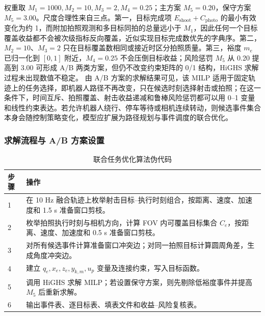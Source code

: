 \documentclass{cumcmthesis}
\begin{document}
权重取 $M_1=1000,M_2=10,M_3=2,M_4=0.25$；主方案 $M_5=0.20$，保守方案 $M_5=3.00$。尺度合理性来自三点。第一，目标完成项 $E_{\mathrm{shoot}}+C_{\mathrm{photo}}$ 的最小有效变化为约 1，而附加拍照观测和多目标同拍的总量远小于 $M_1$，因此任何一个目标覆盖收益都不会被次级指标反向覆盖，近似实现目标完成数优先的字典序。第二，$M_2=10$、$M_3=2$ 只在目标覆盖数相同或接近时区分拍照质量。第三，裕度 $m_e$ 已归一化到 $[0,1]$ 附近，$M_4=0.25$ 不会压倒目标收益；风险惩罚 $M_5$ 从 0.20 提高到 3.00 可形成 A/B 两类方案，但仍不改变约束矩阵的 0/1 结构，HiGHS 求解过程未出现数值不稳定。
由 A/B 方案的求解结果可见，该 MILP 适用于固定轨迹上的任务选择，即机器人路径不再改变，只在候选时刻选择射击或拍照；在这一条件下，时间互斥、拍照覆盖、射击收益递减和鲁棒风险惩罚都可以用 0--1 变量和线性约束表达。若允许机器人绕行、停车等待或相机连续转动，则候选事件集合本身会随控制策略变化，模型应扩展为路径规划与事件调度的联合优化。

\subsubsection{求解流程与 A/B 方案设置}
\begin{table}[H]
  \centering
  \caption{联合任务优化算法伪代码}
  \label{tab:algorithm}
  \small
  \begin{tabular}{p{}p{}}
    \toprule
    步骤 & 操作\\
    \midrule
    1 & 在 10 Hz 融合轨迹上枚举射击目标--执行时刻组合，按距离、速度、加速度和 1.5 s 准备窗口剪枝。\\
    2 & 枚举拍照执行时刻与相机方向，计算 FOV 内可覆盖目标集合 $C_e$，按距离、速度、加速度和 0.5 s 准备窗口剪枝。\\
    3 & 对所有候选事件计算准备窗口冲突边；对同一拍照目标计算圆周角差，生成角度冲突边。\\
    4 & 建立 $q_e,x_e,z_e,y_{k,m},u_p$ 变量及连接约束，写入目标函数。\\
    5 & 调用 HiGHS 求解 MILP；若设置保守方案，则先剔除低裕度事件并提高 $M_5$ 后重新求解。\\
    6 & 输出事件表、逐目标表、填表文件和收益--风险复核表。\\
    \bottomrule
  \end{tabular}
\end{table}
\end{document}
